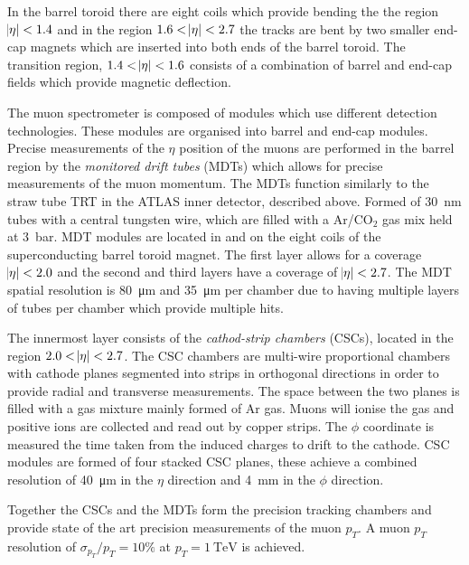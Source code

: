 In the barrel toroid there are eight coils which provide bending the the region $\abs{\eta} < 1.4$ and in the region $1.6 < \abs{\eta} < 2.7$ the tracks are bent by two smaller end-cap magnets which are inserted into both ends of the barrel toroid. The transition region, $1.4 < \abs{\eta} < 1.6$ consists of a combination of barrel and end-cap fields which provide magnetic deflection. 

The muon spectrometer is composed of modules which use different detection technologies. These modules are organised into barrel and end-cap modules. Precise measurements of the $\eta$ position of the muons are performed in the barrel region by the \emph{monitored drift tubes} (MDTs) which allows for precise measurements of the muon momentum. The MDTs function similarly to the straw tube TRT in the ATLAS inner detector, described above. Formed of \SI{30}{\nano\meter} tubes with a central tungsten wire, which are filled with a Ar/CO$_2$ gas mix held at \SI{3}{\bar}. MDT modules are located in and on the eight coils of the superconducting barrel toroid magnet. The first layer allows for a coverage $\abs{\eta} < 2.0$ and the second and third layers have a coverage of $\abs{\eta} < 2.7$. The MDT spatial resolution is \SI{80}{\micro\meter} and \SI{35}{\micro\meter} per chamber due to having multiple layers of tubes per chamber which provide multiple hits. 

The innermost layer consists of the \emph{cathod-strip chambers} (CSCs), located in the region $2.0 < \abs{\eta} < 2.7$. The CSC chambers are multi-wire proportional chambers with cathode planes segmented into strips in orthogonal directions in order to provide radial and transverse measurements. The space between the two planes is filled with a gas mixture mainly formed of Ar gas. Muons will ionise the gas and positive ions are collected and read out by copper strips. The $\phi$ coordinate is measured the time taken from the induced charges to drift to the cathode. CSC modules are formed of four stacked CSC planes, these achieve a combined resolution of \SI{40}{\micro\meter} in the $\eta$ direction and \SI{4}{\milli\meter} in the $\phi$ direction.

Together the CSCs and the MDTs form the precision tracking chambers and provide state of the art precision measurements of the muon $p_{T}$. A muon $p_{T}$ resolution of $\sigma_{p_{T}}/p_{T} = 10 \% $ at  $p_{T} = \SI{1}{\tera\electronvolt}$ is achieved. 

